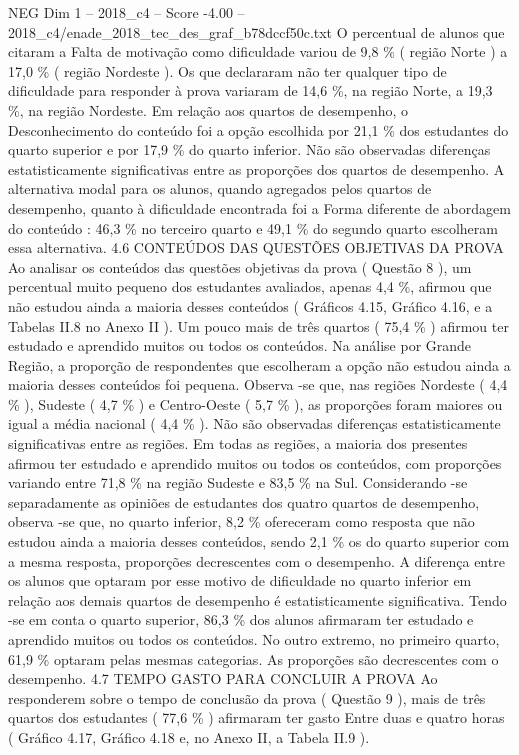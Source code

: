 \begin{textsample}{NEG Dim 1 – 2018\_c4 – Score -4.00 – 2018\_c4/enade\_2018\_tec\_des\_graf\_b78dccf50c.txt}
O percentual de alunos que citaram a Falta de motivação como dificuldade variou de 9,8 \% ( região Norte ) a 17,0 \% ( região Nordeste ).
Os que declararam não ter qualquer tipo de dificuldade para responder à prova variaram de 14,6 \%, na região Norte, a 19,3 \%, na região Nordeste.
Em relação aos quartos de desempenho, o Desconhecimento do conteúdo foi a opção escolhida por 21,1 \% dos estudantes do quarto superior e por 17,9 \% do quarto inferior.
Não são observadas diferenças estatisticamente significativas entre as proporções dos quartos de desempenho.
A alternativa modal para os alunos, quando agregados pelos quartos de desempenho, quanto à dificuldade encontrada foi a Forma diferente de abordagem do conteúdo : 46,3 \% no terceiro quarto e 49,1 \% do segundo quarto escolheram essa alternativa. 4.6 CONTEÚDOS DAS QUESTÕES OBJETIVAS DA PROVA Ao analisar os conteúdos das questões objetivas da prova ( Questão 8 ), um percentual muito pequeno dos estudantes avaliados, apenas 4,4 \%, afirmou que não estudou ainda a maioria desses conteúdos ( Gráficos 4.15, Gráfico 4.16, e a Tabelas II.8 no Anexo II ).
Um pouco mais de três quartos ( 75,4 \% ) afirmou ter estudado e aprendido muitos ou todos os conteúdos.
Na análise por Grande Região, a proporção de respondentes que escolheram a opção não estudou ainda a maioria desses conteúdos foi pequena.
Observa -se que, nas regiões Nordeste ( 4,4 \% ), Sudeste ( 4,7 \% ) e Centro-Oeste ( 5,7 \% ), as proporções foram maiores ou igual a média nacional ( 4,4 \% ).
Não são observadas diferenças estatisticamente significativas entre as regiões.
Em todas as regiões, a maioria dos presentes afirmou ter estudado e aprendido muitos ou todos os conteúdos, com proporções variando entre 71,8 \% na região Sudeste e 83,5 \% na Sul.
Considerando -se separadamente as opiniões de estudantes dos quatro quartos de desempenho, observa -se que, no quarto inferior, 8,2 \% ofereceram como resposta que não estudou ainda a maioria desses conteúdos, sendo 2,1 \% os do quarto superior com a mesma resposta, proporções decrescentes com o desempenho.
A diferença entre os alunos que optaram por esse motivo de dificuldade no quarto inferior em relação aos demais quartos de desempenho é estatisticamente significativa.
Tendo -se em conta o quarto superior, 86,3 \% dos alunos afirmaram ter estudado e aprendido muitos ou todos os conteúdos.
No outro extremo, no primeiro quarto, 61,9 \% optaram pelas mesmas categorias.
As proporções são decrescentes com o desempenho. 4.7 TEMPO GASTO PARA CONCLUIR A PROVA Ao responderem sobre o tempo de conclusão da prova ( Questão 9 ), mais de três quartos dos estudantes ( 77,6 \% ) afirmaram ter gasto Entre duas e quatro horas ( Gráfico 4.17, Gráfico 4.18 e, no Anexo II, a Tabela II.9 ).

\end{textsample}
